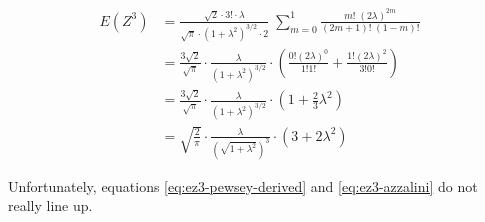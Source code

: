 \documentclass{article}
\begin{document}
\begin{align}
  E(Z^3) &= \frac{\sqrt{2} \cdot 3! \cdot \lambda}{\sqrt{\pi} \cdot (1 + \lambda^2)^{3/2} \cdot 2} \; \sum_{m=0}^1 \frac{m!\;(2\lambda)^{2m}}{(2m + 1)!\;(1 - m)!} \nonumber \\
  &= \frac{3\sqrt{2}}{\sqrt{\pi}} \cdot \frac{\lambda}{(1 + \lambda^2)^{3/2}} \cdot \left( \frac{0! (2\lambda)^0}{1!1!} + \frac{1! (2\lambda)^2}{3!0!} \right) \nonumber \\
  &= \frac{3\sqrt{2}}{\sqrt{\pi}} \cdot \frac{\lambda}{(1 + \lambda^2)^{3/2}} \cdot \left( 1 + \frac{2}{3}\lambda^2 \right) \nonumber \\
  &= \sqrt{\frac{2}{\pi}} \cdot \frac{\lambda}{(\sqrt{1 + \lambda^2})^3} \cdot (3 + 2 \lambda^2) \label{eq:ez3-azzalini}
\end{align}

Unfortunately, equations \eqref{eq:ez3-pewsey-derived} and
\eqref{eq:ez3-azzalini} do not really line up.
\end{document}
